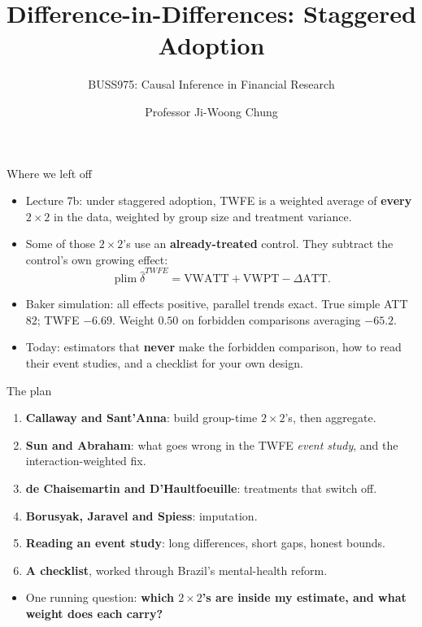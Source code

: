 \documentclass[
  11pt,
  ignorenonframetext,
  aspectratio=169,
]{beamer}
\title{\texorpdfstring{Difference-in-Differences: Staggered
Adoption}{Difference-in-Differences: Staggered Adoption}}
\subtitle{\texorpdfstring{BUSS975: Causal Inference in Financial
Research}{BUSS975: Causal Inference in Financial Research}}
\author{Professor Ji-Woong Chung}
\date{}
\institute{Korea University}
\providecommand{\tightlist}{%
  \setlength{\itemsep}{0pt}\setlength{\parskip}{0pt}}
\begin{document}
\frame{\titlepage}


\begin{frame}{Where we left off}
\protect{}\label{where-we-left-off}
\begin{itemize}
\tightlist
\item
  Lecture 7b: under staggered adoption, TWFE is a weighted average of
  \textbf{every} \(2 \times 2\) in the data, weighted by group size and
  treatment variance.
\item
  Some of those \(2 \times 2\)'s use an \textbf{already-treated}
  control. They subtract the control's own growing effect: \[
  \operatorname{plim}\hat\delta^{TWFE} = \text{VWATT} + \text{VWPT} - \Delta\text{ATT}.
  \]
\item
  Baker simulation: all effects positive, parallel trends exact. True
  simple ATT \(82\); TWFE \(-6.69\). Weight \(0.50\) on forbidden
  comparisons averaging \(-65.2\).
\end{itemize}

\vspace{0.4em}

\begin{itemize}
\tightlist
\item
  Today: estimators that \textbf{never} make the forbidden comparison,
  how to read their event studies, and a checklist for your own design.
\end{itemize}
\end{frame}

\begin{frame}{The plan}
\protect{}\label{the-plan}
\begin{enumerate}
\tightlist
\item
  \textbf{Callaway and Sant'Anna}: build group-time \(2 \times 2\)'s,
  then aggregate.
\item
  \textbf{Sun and Abraham}: what goes wrong in the TWFE \emph{event
  study}, and the interaction-weighted fix.
\item
  \textbf{de Chaisemartin and D'Haultfoeuille}: treatments that switch
  off.
\item
  \textbf{Borusyak, Jaravel and Spiess}: imputation.
\item
  \textbf{Reading an event study}: long differences, short gaps, honest
  bounds.
\item
  \textbf{A checklist}, worked through Brazil's mental-health reform.
\end{enumerate}

\vspace{0.4em}

\begin{itemize}
\tightlist
\item
  One running question: \textbf{which \(2 \times 2\)'s are inside my
  estimate, and what weight does each carry?}
\end{itemize}
\end{frame}
\end{document}
